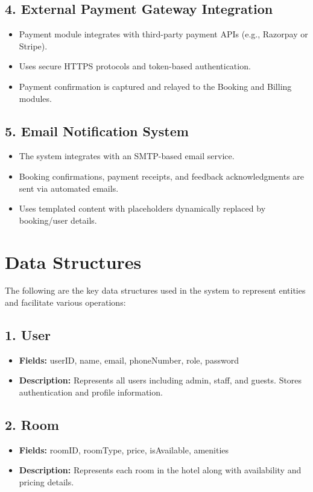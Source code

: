 \documentclass[a4paper,12pt]{article}
\begin{document}
\subsection{4. External Payment Gateway Integration}
\begin{itemize}
    \item Payment module integrates with third-party payment APIs (e.g., Razorpay or Stripe).
    \item Uses secure HTTPS protocols and token-based authentication.
    \item Payment confirmation is captured and relayed to the Booking and Billing modules.
\end{itemize}

\subsection{5. Email Notification System}
\begin{itemize}
    \item The system integrates with an SMTP-based email service.
    \item Booking confirmations, payment receipts, and feedback acknowledgments are sent via automated emails.
    \item Uses templated content with placeholders dynamically replaced by booking/user details.
\end{itemize}

\section{Data Structures}

The following are the key data structures used in the system to represent entities and facilitate various operations:

\subsection{1. User}
\begin{itemize}
    \item \textbf{Fields:} userID, name, email, phoneNumber, role, password
    \item \textbf{Description:} Represents all users including admin, staff, and guests. Stores authentication and profile information.
\end{itemize}

\subsection{2. Room}
\begin{itemize}
    \item \textbf{Fields:} roomID, roomType, price, isAvailable, amenities
    \item \textbf{Description:} Represents each room in the hotel along with availability and pricing details.
\end{itemize}
\end{document}

